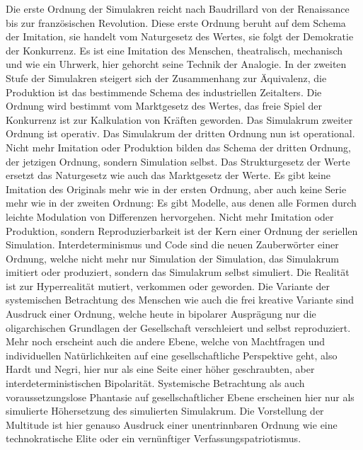 \documentclass[a4paper,11pt]{article}
\begin{document}
Die erste Ordnung der Simulakren reicht nach Baudrillard von der Renaissance
bis zur französischen Revolution. Diese erste Ordnung beruht auf dem Schema
der Imitation, sie handelt vom Naturgesetz des Wertes, sie folgt der
Demokratie der Konkurrenz. Es ist eine Imitation des Menschen, theatralisch,
mechanisch und wie ein Uhrwerk, hier gehorcht seine Technik der Analogie. In
der zweiten Stufe der Simulakren steigert sich der Zusammenhang zur
Äquivalenz, die Produktion ist das bestimmende Schema des industriellen
Zeitalters. Die Ordnung wird bestimmt vom Marktgesetz des Wertes, das freie
Spiel der Konkurrenz ist zur Kalkulation von Kräften geworden. Das Simulakrum
zweiter Ordnung ist operativ. Das Simulakrum der dritten Ordnung nun ist
operational. Nicht mehr Imitation oder Produktion bilden das Schema der
dritten Ordnung, der jetzigen Ordnung, sondern Simulation selbst. Das
Strukturgesetz der Werte ersetzt das Naturgesetz wie auch das Marktgesetz der
Werte. Es gibt keine Imitation des Originals mehr wie in der ersten Ordnung,
aber auch keine Serie mehr wie in der zweiten Ordnung: Es gibt Modelle, aus
denen alle Formen durch leichte Modulation von Differenzen hervorgehen. Nicht
mehr Imitation oder Produktion, sondern Reproduzierbarkeit ist der Kern einer
Ordnung der seriellen Simulation. Interdeterminismus und Code sind die neuen
Zauberwörter einer Ordnung, welche nicht mehr nur Simulation der Simulation,
das Simulakrum imitiert oder produziert, sondern das Simulakrum selbst
simuliert. Die Realität ist zur Hyperrealität mutiert, verkommen oder
geworden. Die Variante der systemischen Betrachtung des Menschen wie auch die
frei kreative Variante sind Ausdruck einer Ordnung, welche heute in bipolarer
Ausprägung nur die oligarchischen Grundlagen der Gesellschaft verschleiert
und selbst reproduziert. Mehr noch erscheint auch die andere Ebene, welche von
Machtfragen und individuellen Natürlichkeiten auf eine gesellschaftliche
Perspektive geht, also Hardt und Negri, hier nur als eine Seite einer höher
geschraubten, aber interdeterministischen Bipolarität. Systemische Betrachtung
als auch voraussetzungslose Phantasie auf gesellschaftlicher Ebene erscheinen
hier nur als simulierte Höhersetzung des simulierten Simulakrum. Die
Vorstellung der Multitude ist hier genauso Ausdruck einer unentrinnbaren
Ordnung wie eine technokratische Elite oder ein vernünftiger
Verfassungspatriotismus.
\end{document}
